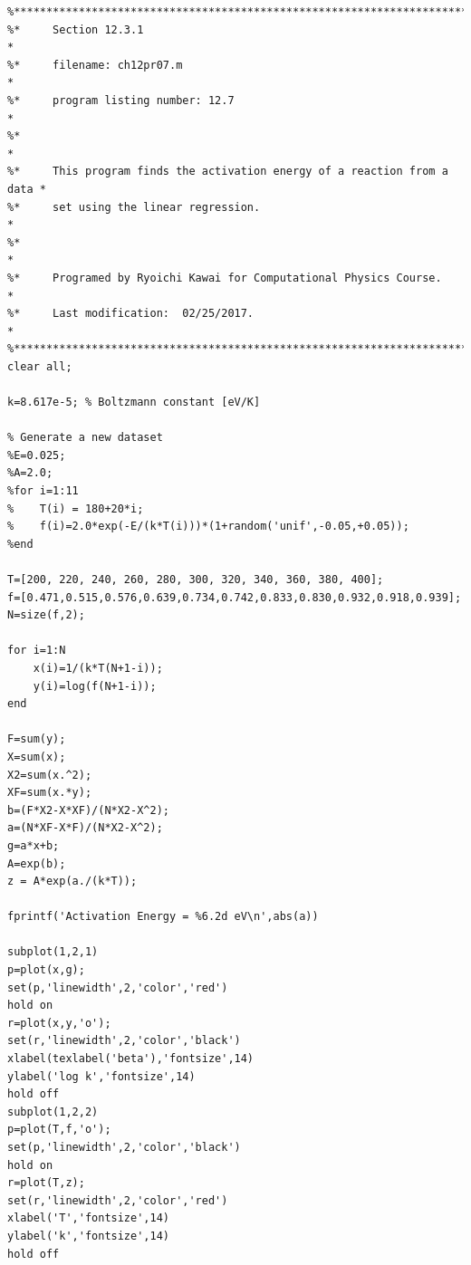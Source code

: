 \bigskip
\noindent
\program
\label{prog:Arrhenius}
\footnotesize
\begin{verbatim}
%**************************************************************************
%*     Section 12.3.1                                                     *
%*     filename: ch12pr07.m                                               *
%*     program listing number: 12.7                                       *
%*                                                                        *
%*     This program finds the activation energy of a reaction from a data *
%*     set using the linear regression.                                   *
%*                                                                        *
%*     Programed by Ryoichi Kawai for Computational Physics Course.       *
%*     Last modification:  02/25/2017.                                    *
%**************************************************************************
clear all;

k=8.617e-5; % Boltzmann constant [eV/K]

% Generate a new dataset
%E=0.025;
%A=2.0;
%for i=1:11
%    T(i) = 180+20*i;
%    f(i)=2.0*exp(-E/(k*T(i)))*(1+random('unif',-0.05,+0.05));
%end

T=[200, 220, 240, 260, 280, 300, 320, 340, 360, 380, 400];
f=[0.471,0.515,0.576,0.639,0.734,0.742,0.833,0.830,0.932,0.918,0.939];
N=size(f,2);

for i=1:N
    x(i)=1/(k*T(N+1-i));
    y(i)=log(f(N+1-i));
end

F=sum(y);
X=sum(x);
X2=sum(x.^2);
XF=sum(x.*y);
b=(F*X2-X*XF)/(N*X2-X^2);
a=(N*XF-X*F)/(N*X2-X^2);
g=a*x+b;
A=exp(b);
z = A*exp(a./(k*T));

fprintf('Activation Energy = %6.2d eV\n',abs(a))

subplot(1,2,1)
p=plot(x,g);
set(p,'linewidth',2,'color','red')
hold on
r=plot(x,y,'o');
set(r,'linewidth',2,'color','black')
xlabel(texlabel('beta'),'fontsize',14)
ylabel('log k','fontsize',14)
hold off
subplot(1,2,2)
p=plot(T,f,'o');
set(p,'linewidth',2,'color','black')
hold on
r=plot(T,z);
set(r,'linewidth',2,'color','red')
xlabel('T','fontsize',14)
ylabel('k','fontsize',14)
hold off
\end{verbatim}
\normalsize

